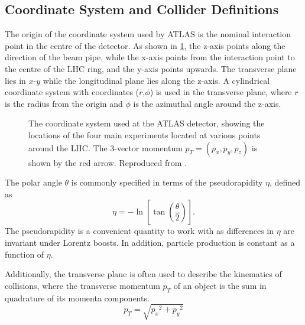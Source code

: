 \subsection{Coordinate System and Collider Definitions}
\label{coordinate-system}


The origin of the coordinate system used by ATLAS is the nominal interaction point in the centre of the detector. As shown in \ref{fig:atlas-coord-system}, the z-axis points along the direction of the beam pipe, while the x-axis points from the interaction point to the centre of the \ac{LHC} ring, and the y-axis points upwards.
The transverse plane lies in $x$-$y$ while the longitudinal plane lies along the z-axis. A cylindrical coordinate system with coordinates ($r$,$\phi$) is used in the transverse plane, where $r$ is the radius from the origin and $\phi$ is the azimuthal angle around the z-axis.

\begin{figure}[!htbp]
  \centering
  
  \caption{
    The coordinate system used at the ATLAS detector, showing the locations of the four main experiments located at various points around the \ac{LHC}. The 3-vector momentum $p_{T} = (p_x, p_y, p_z)$ is shown by the red arrow. Reproduced from \cite{Strong:2020mge}.
  }
  \label{fig:atlas-coord-system}
\end{figure}


The polar angle $\theta$ is commonly specified in terms of the pseudorapidity $\eta$, defined as
%
\begin{equation}\label{eq:pseudorap}
  \eta = - \ln \left[ \tan \left( \frac{\theta}{2} \right) \right] .
\end{equation}
%
The pseudorapidity is a convenient quantity to work with as differences in $\eta$ are invariant under Lorentz boosts. In addition, particle production is constant as a function of $\eta$.

Additionally, the transverse plane is often used to describe the kinematics of collisions, where the transverse momentum $p_{T}$ of an object is the sum in quadrature of its momenta components.
%
\begin{equation}\label{eq:pt}
  p_T = \sqrt{ {p_x}^2 + {p_y}^2 }
\end{equation}



